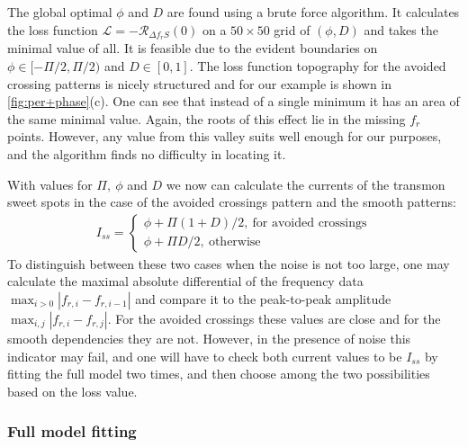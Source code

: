 \documentclass[%
 aip,
 amsmath,amssymb,
 reprint,%
]{revtex4-1}
\begin{document}
The global optimal $\phi$ and $D$ are found using a brute force algorithm. It calculates the loss function $\mathcal{L} = - \mathcal{R}_{\Delta f_r S}(0)$ on a $50 \times 50$ grid of $(\phi, D)$ and takes the minimal value of all. It is feasible due to the evident boundaries on $\phi \in [-\Pi/2,\Pi/2)$ and $D \in [0, 1]$. The loss function topography for the avoided crossing patterns is nicely structured and for our example is shown in \autoref{fig:per+phase}(c). One can see that instead of a single minimum it has an area of the same minimal value. Again, the roots of this effect lie in the missing $f_r$ points. However, any value from this valley suits well enough for our purposes, and the algorithm finds no difficulty in locating it.

With values for $\Pi,\ \phi$ and $D$ we now can calculate the currents of the transmon sweet spots in the case of the avoided crossings pattern and the smooth patterns:
\begin{align}
I_{ss} = 
\begin{cases}
 \phi + \Pi (1+D)/2,\ \text{for avoided crossings}\\
 \phi + \Pi D/2 ,\ \text{otherwise}
\end{cases}
\end{align}
To distinguish between these two cases when the noise is not too large, one may calculate the maximal absolute differential of the frequency data $\max_{i>0} |f_{r,i} - f_{{r,i}-1}|$ and compare it to the peak-to-peak amplitude $\max_{i,j} | f_{r,i} - f_{r, j}|$. For the avoided crossings these values are close and for the smooth dependencies they are not. However, in the presence of noise this indicator may fail, and one will have to check both current values to be $I_{ss}$ by fitting the full model two times, and then choose among the two possibilities based on the loss value.


\subsubsection{Full model fitting}
\end{document}
